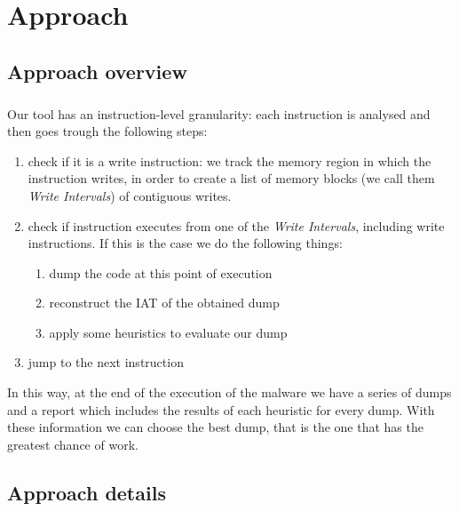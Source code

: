 \chapter{Approach}
\label{chapter3}
\thispagestyle{empty}

\section{Approach overview}
\paragraph{}
Our tool has an instruction-level granularity: each instruction is analysed and then goes trough the following steps:
\begin{enumerate}
\item check if it is a write instruction: we track the memory region in which the instruction writes, in order to create a list of memory blocks (we call them \textit{Write Intervals}) of contiguous writes.
\item check if instruction executes from one of the \textit{Write Intervals}, including write instructions. If this is the case we do the following things:
	\begin{enumerate}
	\item dump the code at this point of execution
	\item reconstruct the IAT of the obtained dump
	\item apply some heuristics to evaluate our dump 
	\end{enumerate}
\item jump to the next instruction
\end{enumerate}
In this way, at the end of the execution of the malware we have a series of dumps and a report which includes the results of each heuristic for every dump. With these information we can choose the best dump, that is the one that has the greatest chance of work.\\

\section{Approach details}
